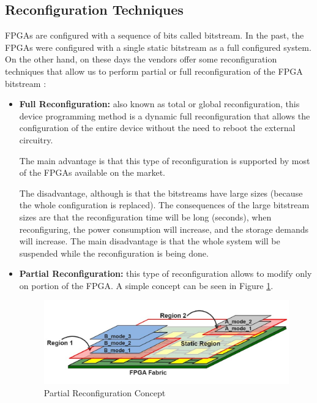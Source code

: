\documentclass[twoside]{romjist}
\begin{document}
	\subsection{Reconfiguration Techniques}
	\hspace{0.5cm}
	FPGAs are configured with a sequence of bits called bitstream. In the past, the FPGAs were
	configured with a single static bitstream as a full configured system. On the other hand, on
	these days the vendors offer some reconfiguration techniques that allow us to perform partial
	or full reconfiguration of the FPGA bitstream \cite{1}:
	\begin{itemize}
		\item
		\textbf{Full Reconfiguration:} also known as total or global reconfiguration, this device
		programming method is a dynamic full reconfiguration that allows the configuration of
		the entire device without the need to reboot the external circuitry.
		
		The main advantage is that this type of reconfiguration is supported by most of the
		FPGAs available on the market.
		
		The disadvantage, although is that the bitstreams have large sizes (because the whole
		configuration is replaced). The consequences of the large bitstream sizes are that the
		reconfiguration time will be long (seconds), when reconfiguring, the power
		consumption will increase, and the storage demands will increase. The main
		disadvantage is that the whole system will be suspended while the reconfiguration is
		being done.
		\item
		\textbf{Partial Reconfiguration:} this type of reconfiguration allows to modify only on portion
		of the FPGA. A simple concept can be seen in Figure \ref{fig:figure21}.
		
		\begin{figure}[h]
			\centering
			\includegraphics[width=\textwidth]{fig_2_1}
			\caption{Partial Reconfiguration Concept \cite{4}}
			\label{fig:figure21}
		\end{figure}
		

\end{itemize}
\end{document}
